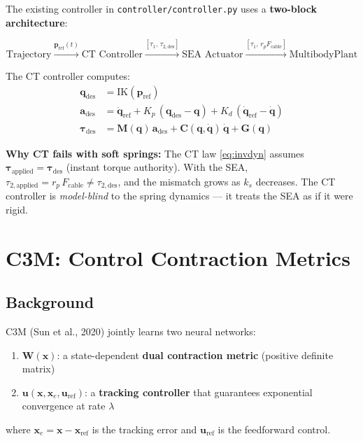 \documentclass[11pt, a4paper]{article}
\newcommand{\bq}{\bm{q}}
\newcommand{\bp}{\bm{p}}
\newcommand{\bu}{\bm{u}}
\newcommand{\bx}{\bm{x}}
\newcommand{\btau}{\bm{\tau}}
\newcommand{\bM}{\bm{M}}
\newcommand{\bC}{\bm{C}}
\newcommand{\bG}{\bm{G}}
\newcommand{\bW}{\bm{W}}
\begin{document}
The existing controller in \texttt{controller/controller.py} uses a
\textbf{two-block architecture}:

\[
\text{Trajectory} \xrightarrow{\bp_\text{ref}(t)}
\text{CT Controller} \xrightarrow{[\tau_1,\,\tau_{2,\text{des}}]}
\text{SEA Actuator} \xrightarrow{[\tau_1,\,r_p F_\text{cable}]}
\text{MultibodyPlant}
\]

The CT controller computes:
\begin{align}
\bq_\text{des} &= \text{IK}(\bp_\text{ref}) \label{eq:ik}  \\
\bm{a}_\text{des} &= \ddot{\bq}_\text{ref}
  + K_p\,(\bq_\text{des} - \bq)
  + K_d\,(\dot{\bq}_\text{ref} - \dot{\bq}) \label{eq:pd}  \\
\btau_\text{des} &= \bM(\bq)\,\bm{a}_\text{des}
  + \bC(\bq, \dot{\bq})\,\dot{\bq}
  + \bG(\bq) \label{eq:invdyn}
\end{align}

\begin{mdframed}
\textbf{Why CT fails with soft springs:}
The CT law \eqref{eq:invdyn} assumes $\btau_\text{applied} = \btau_\text{des}$
(instant torque authority).  With the SEA, $\tau_{2,\text{applied}} = r_p\,F_\text{cable}
\neq \tau_{2,\text{des}}$, and the mismatch grows as $k_s$ decreases.
The CT controller is \emph{model-blind} to the spring dynamics --- it treats
the SEA as if it were rigid.
\end{mdframed}


\section{C3M: Control Contraction Metrics}
\label{sec:c3m}

\subsection{Background}

C3M (Sun et al., 2020) jointly learns two neural networks:
\begin{enumerate}
\item $\bW(\bx)$: a state-dependent \textbf{dual contraction metric}
      (positive definite matrix)
\item $\bu(\bx, \bx_e, \bu_\text{ref})$: a \textbf{tracking controller}
      that guarantees exponential convergence at rate $\lambda$
\end{enumerate}
where $\bx_e = \bx - \bx_\text{ref}$ is the tracking error and
$\bu_\text{ref}$ is the feedforward control.
\end{document}
